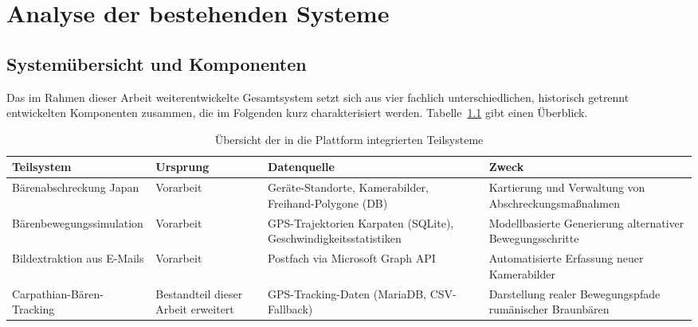 \documentclass[12pt,a4paper]{report}
\begin{document}
\chapter{Analyse der bestehenden Systeme}

\section{Systemübersicht und Komponenten}

Das im Rahmen dieser Arbeit weiterentwickelte Gesamtsystem setzt sich aus vier fachlich unterschiedlichen, historisch getrennt entwickelten Komponenten zusammen, die im Folgenden kurz charakterisiert werden. Tabelle~\ref{tab:subsysteme} gibt einen Überblick.

\begin{table}[h!]
\centering
\caption{Übersicht der in die Plattform integrierten Teilsysteme}
\label{tab:subsysteme}
\begin{tabular}{p{3.2cm}p{3.2cm}p{4cm}p{3.5cm}}
\toprule
\textbf{Teilsystem} & \textbf{Ursprung} & \textbf{Datenquelle} & \textbf{Zweck} \\
\midrule
Bärenabschreckung Japan & Vorarbeit \cite{TODO:LorenzBA} & Geräte-Standorte, Kamerabilder, Freihand-Polygone (DB) & Kartierung und Verwaltung von Abschreckungsmaßnahmen \\
Bärenbewegungssimulation & Vorarbeit \cite{TODO:BreuBA} & GPS-Trajektorien Karpaten (SQLite), Geschwindigkeitsstatistiken & Modellbasierte Generierung alternativer Bewegungsschritte \\
Bildextraktion aus E-Mails & Vorarbeit \cite{TODO:LelchatBA} & Postfach via Microsoft Graph API & Automatisierte Erfassung neuer Kamerabilder \\
Carpathian-Bären-Tracking & Bestandteil dieser Arbeit erweitert & GPS-Tracking-Daten (MariaDB, CSV-Fallback) & Darstellung realer Bewegungspfade rumänischer Braunbären \\
\bottomrule
\end{tabular}
\end{table}
\end{document}
